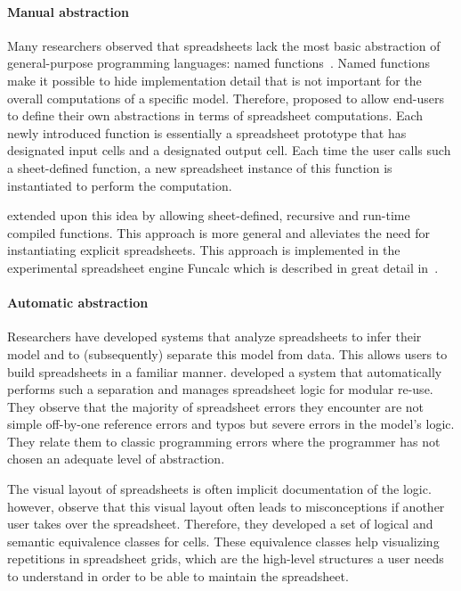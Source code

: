 \documentclass[a4paper]{article}
\begin{document}
\paragraph{Manual abstraction}

Many researchers observed that spreadsheets lack the most basic abstraction of general-purpose programming languages: named functions~\cite{Jones:2003:UAF:944705.944721}. Named functions make it possible to hide implementation detail that is not important for the overall computations of a specific model. Therefore,
\citet{Jones:2003:UAF:944705.944721} proposed to allow end-users to define their own abstractions in terms of spreadsheet computations. Each newly introduced function is essentially a spreadsheet prototype that has designated input cells and a designated output cell. Each time the user calls such a sheet-defined function, a new spreadsheet instance of this function is instantiated to perform the computation.

\citet{Sestoft:2008:IFS:1370847.1370867} extended upon this idea by allowing sheet-defined, recursive and run-time compiled functions. This approach is more general and alleviates the need for instantiating explicit spreadsheets. This approach is implemented in the experimental spreadsheet engine Funcalc which is described in great detail in~\cite{Sestoft2014Spreadsheet}.

\paragraph{Automatic abstraction}

Researchers have developed systems that analyze spreadsheets to infer their model and to (subsequently) separate this model from data. This allows users to build spreadsheets in a familiar manner. \citet{Isakowitz:1995:TLT:195705.195708} developed a system that automatically performs such a separation and manages spreadsheet logic for modular re-use. They observe that the majority of spreadsheet errors they encounter are not simple off-by-one reference errors and typos but severe errors in the model's logic. They relate them to classic programming errors where the programmer has not chosen an adequate level of abstraction.

The visual layout of spreadsheets is often implicit documentation of the logic. \citet{1173080} however, observe that this visual layout often leads to misconceptions if another user takes over the spreadsheet. Therefore, they developed a set of logical and semantic equivalence classes for cells. These equivalence classes help visualizing repetitions in spreadsheet grids, which are the high-level structures a user needs to understand in order to be able to maintain the spreadsheet.
\end{document}
